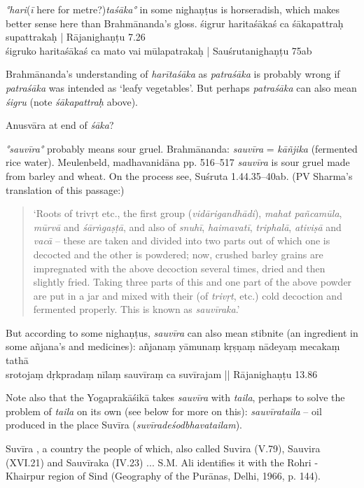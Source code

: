 \begin{ekdosis}
\begin{philcomm}[hp01_059]
\emph{°hari}(\emph{ī} here for metre?)\emph{taśāka°} in some nighaṇṭus is horseradish, which makes better sense here than Brahmānanda’s gloss.
\startverse
śigrur haritaśākaś ca śākapattraḥ supattrakaḥ | \textup{Rājanighaṇṭu 7.26}\\
śigruko haritaśākaś ca mato vai mūlapatrakaḥ | \textup{Sauśrutanighaṇṭu 75ab}\\
\endverse

Brahmānanda’s understanding of \emph{harītaśāka} as \emph{patraśāka} is probably wrong if \emph{patraśāka} was intended as ‘leafy vegetables’. But perhaps \emph{patraśāka} can also mean \emph{śigru} (note \emph{śākapattraḥ} above).

Anusvāra at end of \emph{śāka}?

\emph{°sauvīra°} probably means sour gruel.
Brahmānanda: \emph{sauvīra} = \emph{kāñjika} (fermented rice water).
Meulenbeld, madhavanidāna pp. 516–517
\emph{sauvīra} is sour gruel made from barley and wheat. On the process see, Suśruta 1.44.35--40ab.
(PV Sharma’s translation of this passage:)

\begin{quote}
‘Roots of trivṛt etc., the first group (\emph{vidārigandhādi}), \emph{mahat pañcamūla}, \emph{mūrvā} and \emph{śārṅgaṣṭā}, and also of \emph{snuhī}, \emph{haimavatī}, \emph{triphalā}, \emph{ativiṣā} and \emph{vacā} -- these are taken and divided into two parts out of which one is decocted and the other is powdered; now, crushed barley grains are impregnated with the above decoction several times, dried and then slightly fried. Taking three parts of this and one part of the above powder are put in a jar and mixed with their (of \emph{trivṛt}, etc.) cold decoction and fermented properly. This is known as \emph{sauvīraka}.’
\end{quote}

But according to some nighaṇṭus, \emph{sauvīra} can also mean stibnite (an ingredient in some añjana’s and medicines):
\startverse
añjanaṃ yāmunaṃ kṛṣṇaṃ nādeyaṃ mecakaṃ tathā \\
srotojaṃ dṛkpradaṃ nīlaṃ sauvīraṃ ca suvīrajam ||  \textup{Rājanighaṇṭu 13.86}
\endverse

Note also that the Yogaprakāśikā takes \emph{sauvīra} with \emph{taila}, perhaps to solve the problem of \emph{taila} on its own (see below for more on this): \emph{sauvīrataila} -- oil produced in the place Suvīra (\emph{suvīradeśodbhavatailam}).

Suvīra , a country the people of which, also called Suvira (V.79), Sauvira (XVI.21) and Sauvīraka (IV.23) ... S.M. Ali identifies it with the Rohri - Khairpur region of Sind (Geography of the Purānas, Delhi, 1966, p. 144).


\end{philcomm}
\end{ekdosis}
